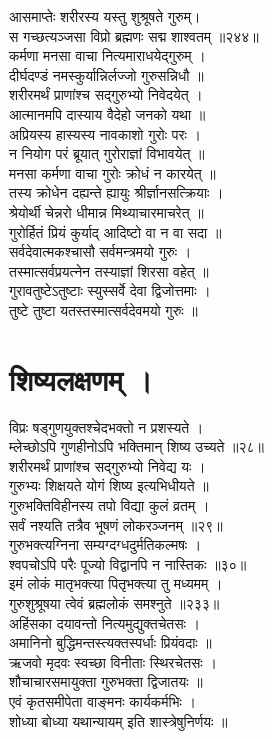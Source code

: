 आसमाप्तेः शरीरस्य यस्तु शुश्रूषते गुरुम्।\\[-2mm]
स गच्छत्यञ्जसा विप्रो ब्रह्मणः सद्म शाश्वतम् ॥२४४॥\\
कर्मणा मनसा वाचा नित्यमाराधयेद्गुरुम् ।\\[-2mm]
दीर्घदण्डं नमस्कुर्यान्निर्लज्जो गुरुसन्निधौ ॥\\
शरीरमर्थं प्राणांश्च सद्गुरुभ्यो निवेदयेत् ।\\[-2mm]
आत्मानमपि दास्याय वैदेहो जनको यथा ॥\\
अप्रियस्य हास्यस्य नावकाशो  गुरोः परः ।\\[-2mm]
न नियोग परं ब्रूयात् गुरोराज्ञां विभावयेत् ॥\\
मनसा कर्मणा वाचा गुरोः क्रोधं न कारयेत् ॥\\
तस्य क्रोधेन दह्यन्ते ह्यायुः श्रीर्ज्ञानसत्क्रियाः ।\\[-2mm]
श्रेयोर्थी चेन्नरो धीमान्न मिथ्याचारमाचरेत् ॥\\
गुरोर्हितं प्रियं कुर्याद् आदिष्टो वा न वा सदा ॥\\
सर्वदेवात्मकश्चासौ सर्वमन्त्रमयो गुरुः ।\\[-2mm]
तस्मात्सर्वप्रयत्नेन तस्याज्ञां शिरसा वहेत् ॥\\
गुरावतुष्टेऽतुष्टाः स्युस्सर्वे देवा द्विजोत्तमाः ।\\[-2mm]
तुष्टे तुष्टा यतस्तस्मात्सर्वदेवमयो गुरुः ॥\\

\section{शिष्यलक्षणम् ।}

विप्रः षड्गुणयुक्तश्चेदभक्तो न प्रशस्यते ।\\[-2mm]
म्लेच्छोऽपि गुणहीनोऽपि भक्तिमान् शिष्य उच्यते ॥२८॥\\
शरीरमर्थं प्राणांश्च सद्गुरुभ्यो निवेद्य यः ।\\[-2mm]
गुरुभ्यः शिक्षयते योगं शिष्य इत्यभिधीयते ॥\\
गुरुभक्तिविहीनस्य तपो विद्या कुलं व्रतम् ।\\[-2mm]
सर्वं नश्यति तत्रैव भूषणं लोकरञ्जनम् ॥२९॥\\
गुरुभक्त्यग्निना सम्यग्दग्धदुर्मतिकल्मषः ।\\[-2mm]
श्वपचोऽपि परैः पूज्यो विद्वानपि न नास्तिकः ॥३०॥\\
इमं लोकं मातृभक्त्या पितृभक्त्या तु मध्यमम् ।\\[-2mm]
गुरुशुश्रूषया त्वेवं ब्रह्मलोकं समश्नुते ॥२३३॥\\
अहिंसका दयावन्तो नित्यमुद्युक्तचेतसः ।\\[-2mm]
अमानिनो बुद्धिमन्तस्त्यक्तस्पर्धाः प्रियंवदाः ॥\\
ऋजवो मृदवः स्वच्छा विनीताः स्थिरचेतसः ।\\[-2mm]
शौचाचारसमायुक्ता गुरुभक्ता द्विजातयः ॥\\
एवं कृतसमीपेता वाङ्मनः कार्यकर्मभिः ।\\[-2mm]
शोध्या बोध्या यथान्यायम् इति शास्त्रेषुनिर्णयः ॥\\

